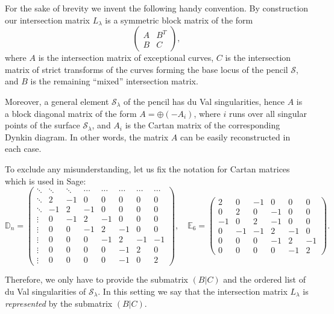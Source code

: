 \documentclass[10pt]{amsart}
\numberwithin{equation}{section}
\theoremstyle{plain}
\theoremstyle{definition}
\theoremstyle{remark}
\begin{document}
For the sake of brevity we invent the following handy convention. By construction our intersection matrix \(L_{\lambda}\) is a symmetric block matrix of the form
\[
  \begin{pmatrix}
    A & B^T \\
    B & C
  \end{pmatrix},
\]
where \(A\) is the intersection matrix of exceptional curves, \(C\) is the intersection matrix of strict transforms of the curves forming the base locus of the pencil \(\mathcal{S}\), and \(B\) is the remaining ``mixed'' intersection matrix.

Moreover, a general element \(\mathcal{S}_{\lambda}\) of the pencil has du Val singularities, hence \(A\) is a block diagonal matrix of the form \(A = \oplus (-A_i)\), where \(i\) runs over all singular points of the surface \(\mathcal{S}_{\lambda}\), and \(A_i\) is the Cartan matrix of the corresponding Dynkin diagram. In other words, the matrix \(A\) can be easily reconstructed in each case.

To exclude any misunderstanding, let us fix the notation for Cartan matrices which is used in Sage:
\[
  \mathbb{D}_n =
  \left (
  \begin{array}{cccc|cccc}
    \ddots & \ddots & \ddots & \cdots & \cdots & \cdots & \cdots & \cdots \\
    \ddots & 2 & -1 & 0 & 0 & 0 & 0 & 0 \\
    \ddots & -1 & 2 & -1 & 0 & 0 & 0 & 0 \\
    \vdots & 0 & -1 & 2 & -1 & 0 & 0 & 0 \\
    \hline
    \vdots & 0 & 0 & -1 & 2 & -1 & 0 & 0 \\
    \vdots & 0 & 0 & 0 & -1 & 2 & -1 & -1 \\
    \vdots & 0 & 0 & 0 & 0 & -1 & 2 & 0 \\
    \vdots & 0 & 0 & 0 & 0 & -1 & 0 & 2
  \end{array}
  \right ), \quad
  \mathbb{E}_6 =
  \begin{pmatrix}
    2 & 0 & -1 & 0 & 0 & 0 \\
    0 & 2 & 0 & -1 & 0 & 0 \\
    -1 & 0 & 2 & -1 & 0 & 0 \\
    0 & -1 & -1 & 2 & -1 & 0 \\
    0 & 0 & 0 & -1 & 2 & -1 \\
    0 & 0 & 0 & 0 & -1 & 2
  \end{pmatrix}.
\]

Therefore, we only have to provide the submatrix \((B \vert C)\) and the ordered list of du Val singularities of \(\mathcal{S}_{\lambda}\). In this setting we say that the intersection matrix \(L_{\lambda}\) is \emph{represented} by the submatrix \((B \vert C)\).
\end{document}
